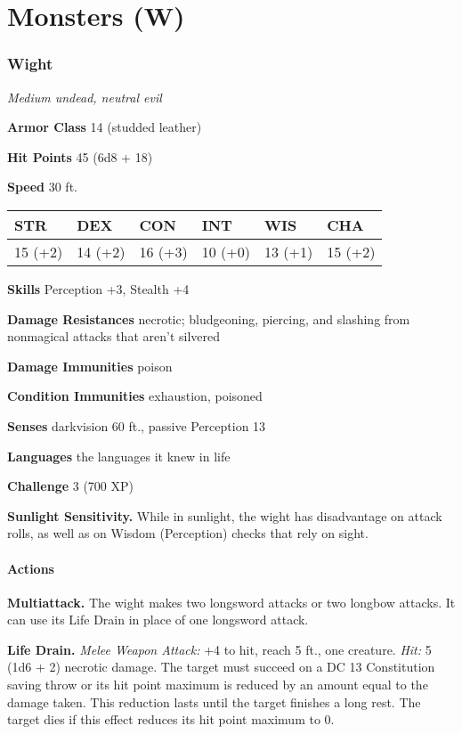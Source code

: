 \documentclass[
]{article}
\date{}
\begin{document}
\hypertarget{monsters-w}{%
\section{Monsters (W)}\label{monsters-w}}

\hypertarget{wight}{%
\subsubsection{Wight}\label{wight}}

\emph{Medium undead, neutral evil}

\textbf{Armor Class} 14 (studded leather)

\textbf{Hit Points} 45 (6d8 + 18)

\textbf{Speed} 30 ft.

\begin{longtable}[]{@{}llllll@{}}
\toprule
STR & DEX & CON & INT & WIS & CHA\tabularnewline
\midrule
\endhead
15 (+2) & 14 (+2) & 16 (+3) & 10 (+0) & 13 (+1) & 15 (+2)\tabularnewline
\bottomrule
\end{longtable}

\textbf{Skills} Perception +3, Stealth +4

\textbf{Damage Resistances} necrotic; bludgeoning, piercing, and
slashing from nonmagical attacks that aren't silvered

\textbf{Damage Immunities} poison

\textbf{Condition Immunities} exhaustion, poisoned

\textbf{Senses} darkvision 60 ft., passive Perception 13

\textbf{Languages} the languages it knew in life

\textbf{Challenge} 3 (700 XP)

\textbf{Sunlight Sensitivity.} While in sunlight, the wight has
disadvantage on attack rolls, as well as on Wisdom (Perception) checks
that rely on sight.

\hypertarget{actions}{%
\paragraph{Actions}\label{actions}}

\textbf{Multiattack.} The wight makes two longsword attacks or two
longbow attacks. It can use its Life Drain in place of one longsword
attack.

\textbf{Life Drain.} \emph{Melee Weapon Attack:} +4 to hit, reach 5 ft.,
one creature. \emph{Hit:} 5 (1d6 + 2) necrotic damage. The target must
succeed on a DC 13 Constitution saving throw or its hit point maximum is
reduced by an amount equal to the damage taken. This reduction lasts
until the target finishes a long rest. The target dies if this effect
reduces its hit point maximum to 0.
\end{document}
